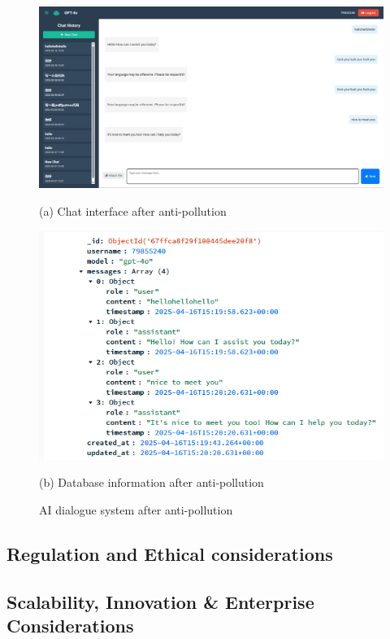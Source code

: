 \documentclass{article}
\begin{document}
\begin{figure}[H]
    \begin{minipage}{0.5\textwidth}
        \centering
        \includegraphics[width=\textwidth]{images/Chat_interface_after_anti_pollution.png}
        \caption*{(a) Chat interface after anti-pollution}
    \end{minipage}
    \hfill
    \begin{minipage}{0.5\textwidth}
        \centering
        \includegraphics[width=\textwidth]{images/Database_information_after_anti_pollution.png}
        \caption*{(b) Database information after anti-pollution}
    \end{minipage}
    \caption{AI dialogue system after anti-pollution}
    \label{fig:pollution}
\end{figure}


\subsection{Regulation and Ethical considerations}
\subsection{Scalability, Innovation \& Enterprise Considerations}

\vfill\pagebreak



\end{document}
